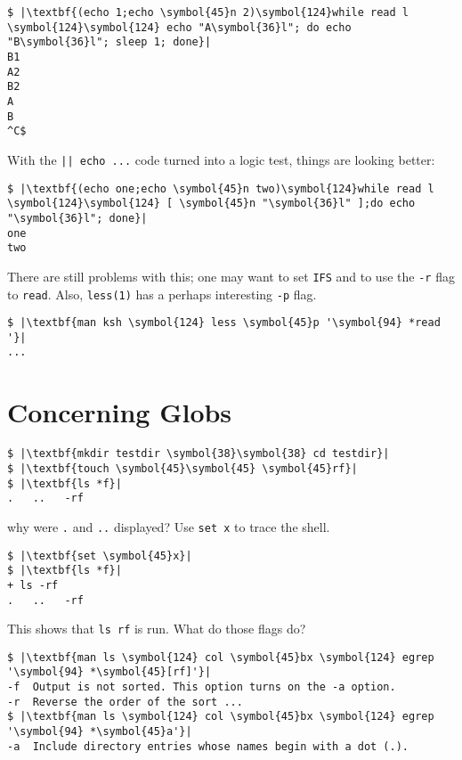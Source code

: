 \documentclass[10pt,a4paper]{article}
\begin{document}
\begin{lstlisting}
$ |\textbf{(echo 1;echo \symbol{45}n 2)\symbol{124}while read l \symbol{124}\symbol{124} echo "A\symbol{36}l"; do echo "B\symbol{36}l"; sleep 1; done}|
B1
A2
B2
A
B
^C$
\end{lstlisting}

With the \texttt{|| echo ...} code turned into a logic test, things are
looking better:

\begin{lstlisting}
$ |\textbf{(echo one;echo \symbol{45}n two)\symbol{124}while read l \symbol{124}\symbol{124} [ \symbol{45}n "\symbol{36}l" ];do echo "\symbol{36}l"; done}|
one
two
\end{lstlisting}

There are still problems with this; one may want to set \texttt{IFS} and
to use the \texttt{-r} flag to \texttt{read}. Also, \texttt{less(1)} has
a perhaps interesting \texttt{-p} flag.

\begin{lstlisting}
$ |\textbf{man ksh \symbol{124} less \symbol{45}p '\symbol{94} *read '}|
...
\end{lstlisting}

\section*{Concerning Globs}

\begin{lstlisting}
$ |\textbf{mkdir testdir \symbol{38}\symbol{38} cd testdir}|
$ |\textbf{touch \symbol{45}\symbol{45} \symbol{45}rf}|
$ |\textbf{ls *f}|
.   ..   -rf
\end{lstlisting}

why were \texttt{.} and \texttt{..} displayed? Use \texttt{set x} to trace the shell.

\begin{lstlisting}
$ |\textbf{set \symbol{45}x}|
$ |\textbf{ls *f}|
+ ls -rf
.   ..   -rf
\end{lstlisting}

This shows that \texttt{ls rf} is run. What do those flags do?

\begin{lstlisting}
$ |\textbf{man ls \symbol{124} col \symbol{45}bx \symbol{124} egrep '\symbol{94} *\symbol{45}[rf]'}|
-f  Output is not sorted. This option turns on the -a option.
-r  Reverse the order of the sort ...
$ |\textbf{man ls \symbol{124} col \symbol{45}bx \symbol{124} egrep '\symbol{94} *\symbol{45}a'}|
-a  Include directory entries whose names begin with a dot (.).
\end{lstlisting}
\end{document}
